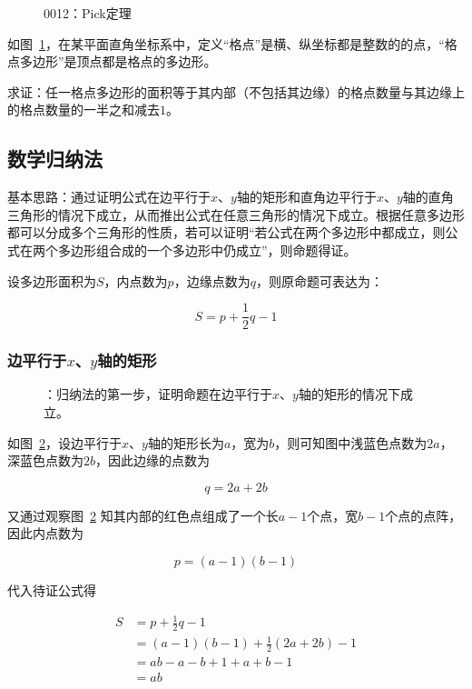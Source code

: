 

\begin{figure}[htbp]
  \centering
  \caption{0012：Pick定理} \label{fig:0012}
\end{figure}

如图~\ref{fig:0012}，在某平面直角坐标系中，定义“格点”是横、纵坐标都是整数的的点，“格点多边形”是顶点都是格点的多边形。

求证：任一格点多边形的面积等于其内部（不包括其边缘）的格点数量与其边缘上的格点数量的一半之和减去$1$。

\subsection{数学归纳法} \label{subsec:0012-ind}

基本思路：通过证明公式在边平行于$x$、$y$轴的矩形和直角边平行于$x$、$y$轴的直角三角形的情况下成立，从而推出公式在任意三角形的情况下成立。根据任意多边形都可以分成多个三角形的性质，若可以证明“若公式在两个多边形中都成立，则公式在两个多边形组合成的一个多边形中仍成立”，则命题得证。

设多边形面积为$S$，内点数为$p$，边缘点数为$q$，则原命题可表达为：

\[ S = p + \frac12q - 1 \]

\subsubsection{边平行于$x$、$y$轴的矩形} \label{subsubsec:0012-ind-rect}

\begin{figure}[htbp]
  \centering
  \caption{：归纳法的第一步，证明命题在边平行于$x$、$y$轴的矩形的情况下成立。}
  \label{fig:0012-ind-rect}
\end{figure}

如图~\ref{fig:0012-ind-rect}，设边平行于$x$、$y$轴的矩形长为$a$，宽为$b$，则可知图中浅蓝色点数为$2a$，深蓝色点数为$2b$，因此边缘的点数为

\[ q = 2a + 2b \]

又通过观察图~\ref{fig:0012-ind-rect} 知其内部的红色点组成了一个长$a - 1$个点，宽$b - 1$个点的点阵，因此内点数为

\[ p = (a - 1)(b - 1) \]

代入待证公式得

\begin{align*}
  S &= p + \frac12q - 1 \\
  &= (a - 1)(b - 1) + \frac12(2a + 2b) - 1 \\
  &= ab - a - b + 1 + a + b - 1 \\
  &= ab \\
\end{align*}


